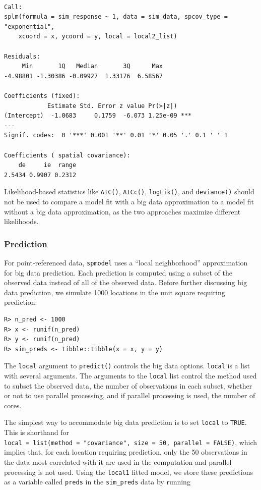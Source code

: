 \documentclass[10pt,letterpaper]{article}
\begin{document}
\begin{verbatim}

Call:
splm(formula = sim_response ~ 1, data = sim_data, spcov_type = "exponential", 
    xcoord = x, ycoord = y, local = local2_list)

Residuals:
     Min       1Q   Median       3Q      Max 
-4.98801 -1.30386 -0.09927  1.33176  6.58567 

Coefficients (fixed):
            Estimate Std. Error z value Pr(>|z|)    
(Intercept)  -1.0683     0.1759  -6.073 1.25e-09 ***
---
Signif. codes:  0 '***' 0.001 '**' 0.01 '*' 0.05 '.' 0.1 ' ' 1

Coefficients ( spatial covariance):
    de     ie  range 
2.5434 0.9907 0.2312 
\end{verbatim}

Likelihood-based statistics like \texttt{AIC()}, \texttt{AICc()},
\texttt{logLik()}, and \texttt{deviance()} should not be used to compare
a model fit with a big data approximation to a model fit without a big
data approximation, as the two approaches maximize different
likelihoods.

\hypertarget{sec:predict}{%
\subsubsection{Prediction}\label{sec:predict}}

For point-referenced data, \texttt{spmodel} uses a ``local
neighborhood'' approximation for big data prediction. Each prediction is
computed using a subset of the observed data instead of all of the
observed data. Before further discussing big data prediction, we
simulate 1000 locations in the unit square requiring prediction:

\begin{verbatim}
R> n_pred <- 1000
R> x <- runif(n_pred)
R> y <- runif(n_pred)
R> sim_preds <- tibble::tibble(x = x, y = y)
\end{verbatim}

The \texttt{local} argument to \texttt{predict()} controls the big data
options. \texttt{local} is a list with several arguments. The arguments
to the \texttt{local} list control the method used to subset the
observed data, the number of observations in each subset, whether or not
to use parallel processing, and if parallel processing is used, the
number of cores.

The simplest way to accommodate big data prediction is to set
\texttt{local} to \texttt{TRUE}. This is shorthand for
\texttt{local\ =\ list(method\ =\ "covariance",\ size\ =\ 50,\ parallel\ =\ FALSE)},
which implies that, for each location requiring prediction, only the 50
observations in the data most correlated with it are used in the
computation and parallel processing is not used. Using the
\texttt{local1} fitted model, we store these predictions as a variable
called \texttt{preds} in the \texttt{sim\_preds} data by running
\end{document}
